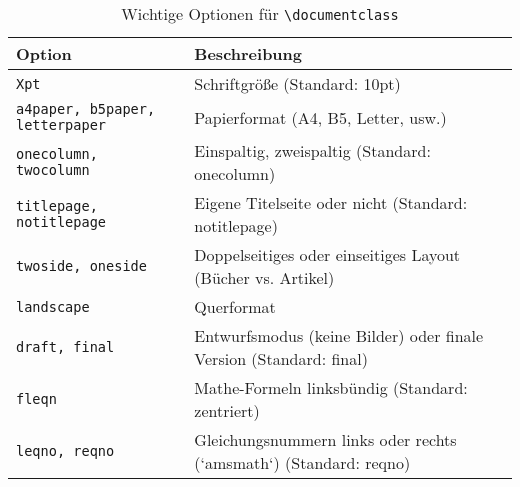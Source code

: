 \begin{table}[h]
    \centering
    \begin{tabular}{ll}
        \toprule
        \textbf{Option}                        & \textbf{Beschreibung}                                              \\
        \midrule
        \texttt{Xpt}                           & Schriftgröße (Standard: 10pt)                                      \\
        \texttt{a4paper, b5paper, letterpaper} & Papierformat (A4, B5, Letter, usw.)                                \\
        \texttt{onecolumn, twocolumn}          & Einspaltig, zweispaltig (Standard: onecolumn)                      \\
        \texttt{titlepage, notitlepage}        & Eigene Titelseite oder nicht    (Standard: notitlepage)            \\
        \texttt{twoside, oneside}              & Doppelseitiges oder einseitiges Layout (Bücher vs. Artikel)        \\
        \texttt{landscape}                     & Querformat                                                         \\
        \texttt{draft, final}                  & Entwurfsmodus (keine Bilder) oder finale Version (Standard: final) \\
        \texttt{fleqn}                         & Mathe-Formeln linksbündig (Standard: zentriert)                    \\
        \texttt{leqno, reqno}                  & Gleichungsnummern links oder rechts (`amsmath`) (Standard: reqno)  \\
        \bottomrule
    \end{tabular}
    \caption{Wichtige Optionen für \texttt{\textbackslash documentclass}}
    \label{tab:documentclass-options}
\end{table}
